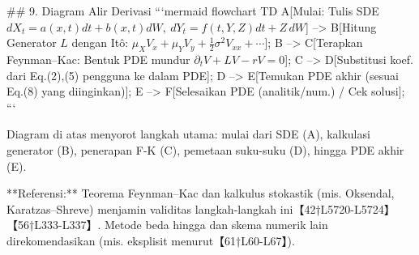 \documentclass{article}
\begin{document}
## 9. Diagram Alir Derivasi  
```mermaid
flowchart TD
    A[Mulai: Tulis SDE \(dX_t=a(x,t)dt+b(x,t)dW, \ dY_t=f(t,Y,Z)dt+Z\,dW\)] --> 
    B[Hitung Generator \(L\) dengan Itô: \(\mu_XV_x + \mu_YV_y + \tfrac12\sigma^2V_{xx} + \cdots\)];
    B --> C[Terapkan Feynman–Kac: Bentuk PDE mundur \(\partial_tV + L V - rV = 0\)];
    C --> D[Substitusi koef. dari Eq.(2),(5) pengguna ke dalam PDE];
    D --> E[Temukan PDE akhir (sesuai Eq.(8) yang diinginkan)];
    E --> F[Selesaikan PDE (analitik/num.) / Cek solusi];
```

Diagram di atas menyorot langkah utama: mulai dari SDE (A), kalkulasi generator (B), penerapan F-K (C), pemetaan suku-suku (D), hingga PDE akhir (E). 

**Referensi:** Teorema Feynman–Kac dan kalkulus stokastik (mis. Oksendal, Karatzas–Shreve) menjamin validitas langkah-langkah ini【42†L5720-L5724】【56†L333-L337】. Metode beda hingga dan skema numerik lain direkomendasikan (mis. eksplisit menurut【61†L60-L67】). 
\end{document}
